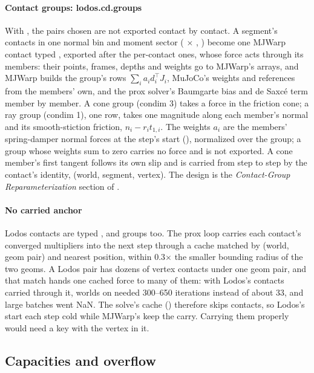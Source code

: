 \paragraph{Contact groups: lodos.cd.groups} With , the pairs chosen are not exported contact by contact. A segment's contacts in one normal bin and moment sector ( $\times$ , ) become one MJWarp contact typed , exported after the per-contact ones, whose force acts through its members: their points, frames, depths and weights go to MJWarp's  arrays, and MJWarp builds the group's rows $\sum_i a_i d_i^\top J_i$, MuJoCo's weights and references from the members' own, and the prox solver's Baumgarte bias and de Saxc\'e term member by member. A cone group (condim 3) takes a force in the friction cone; a ray group (condim 1), one row, takes one magnitude along each member's normal and its smooth-stiction friction, $n_i - r_i t_{1,i}$. The weights $a_i$ are the members' spring-damper normal forces at the step's start (), normalized over the group; a group whose weights sum to zero carries no force and is not exported. A cone member's first tangent follows its own slip and is carried from step to step by the contact's identity, (world, segment, vertex). The design is the \emph{Contact-Group Reparameterization} section of .

\paragraph{No carried anchor} Lodos contacts are typed , and groups  too. The prox loop carries each contact's converged multipliers into the next step through a cache matched by (world, geom pair) and nearest position, within 0.3$\times$ the smaller bounding radius of the two geoms. A Lodos pair has dozens of vertex contacts under one geom pair, and that match hands one cached force to many of them: with Lodos's contacts carried through it, worlds on  needed 300--650 iterations instead of about 33, and large batches went NaN. The solve's cache () therefore skips  contacts, so Lodos's start each step cold while MJWarp's keep the carry. Carrying them properly would need a key with the vertex in it.

\subsection{Capacities and overflow}\label{sec:capacities}

